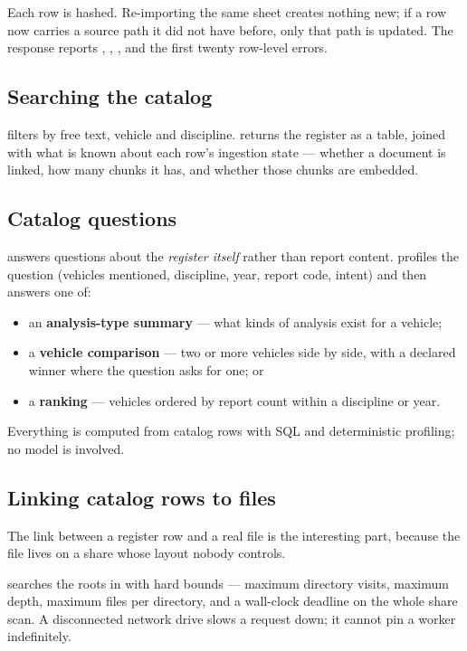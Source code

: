 Each row is hashed. Re-importing the same sheet creates nothing new; if a row now
carries a source path it did not have before, only that path is updated. The
response reports , ,
,  and the first twenty row-level
errors.

\subsection{Searching the catalog}

 filters by free text, vehicle and discipline.
 returns the register as a table, joined with what is
known about each row's ingestion state --- whether a document is linked, how many
chunks it has, and whether those chunks are embedded.

\subsection{Catalog questions}

 answers questions about the \emph{register itself}
rather than report content.  profiles the question (vehicles
mentioned, discipline, year, report code, intent) and then answers one of:

\begin{itemize}
\item an \textbf{analysis-type summary} --- what kinds of analysis exist for a
vehicle;
\item a \textbf{vehicle comparison} --- two or more vehicles side by side, with a
declared winner where the question asks for one; or
\item a \textbf{ranking} --- vehicles ordered by report count within a discipline
or year.
\end{itemize}

Everything is computed from catalog rows with SQL and deterministic profiling; no
model is involved.

\subsection{Linking catalog rows to files}

The link between a register row and a real file is the interesting part, because
the file lives on a share whose layout nobody controls.

 searches the roots in 
with hard bounds --- maximum directory visits, maximum depth, maximum files per
directory, and a wall-clock deadline on the whole share scan. A disconnected
network drive slows a request down; it cannot pin a worker indefinitely.


